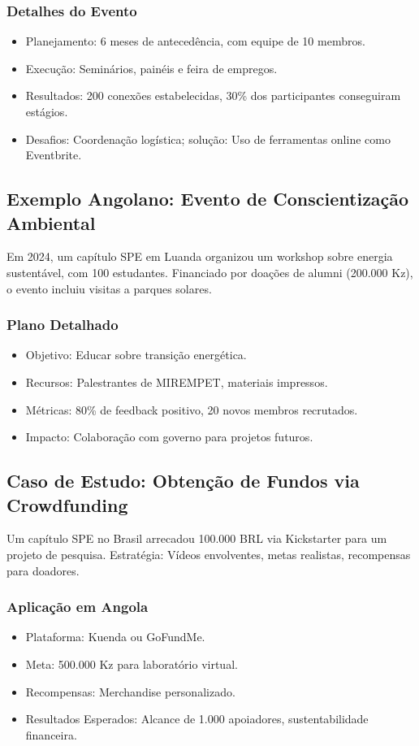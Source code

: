 \documentclass[12pt]{article}
\begin{document}
\subsubsection{Detalhes do Evento}
\begin{itemize}
    \item Planejamento: 6 meses de antecedência, com equipe de 10 membros.
    \item Execução: Seminários, painéis e feira de empregos.
    \item Resultados: 200 conexões estabelecidas, 30\% dos participantes conseguiram estágios.
    \item Desafios: Coordenação logística; solução: Uso de ferramentas online como Eventbrite.
\end{itemize}

\subsection{Exemplo Angolano: Evento de Conscientização Ambiental}
Em 2024, um capítulo SPE em Luanda organizou um workshop sobre energia sustentável, com 100 estudantes. Financiado por doações de alumni (200.000 Kz), o evento incluiu visitas a parques solares.

\subsubsection{Plano Detalhado}
\begin{itemize}
    \item Objetivo: Educar sobre transição energética.
    \item Recursos: Palestrantes de MIREMPET, materiais impressos.
    \item Métricas: 80\% de feedback positivo, 20 novos membros recrutados.
    \item Impacto: Colaboração com governo para projetos futuros.
\end{itemize}

\subsection{Caso de Estudo: Obtenção de Fundos via Crowdfunding}
Um capítulo SPE no Brasil arrecadou 100.000 BRL via Kickstarter para um projeto de pesquisa. Estratégia: Vídeos envolventes, metas realistas, recompensas para doadores.

\subsubsection{Aplicação em Angola}
\begin{itemize}
    \item Plataforma: Kuenda ou GoFundMe.
    \item Meta: 500.000 Kz para laboratório virtual.
    \item Recompensas: Merchandise personalizado.
    \item Resultados Esperados: Alcance de 1.000 apoiadores, sustentabilidade financeira.
\end{itemize}
\end{document}
